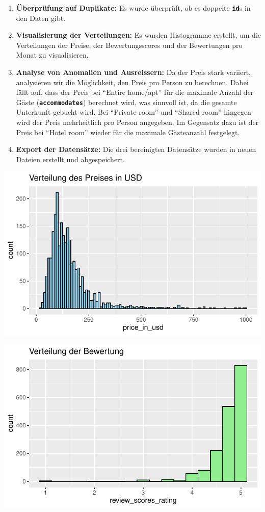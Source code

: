 \documentclass[
  journal,
]{IEEEtran}%
\begin{document}
\begin{enumerate}
\def\labelenumi{\arabic{enumi}.}
\item
  \textbf{Überprüfung auf Duplikate:} Es wurde überprüft, ob es doppelte
  \textbf{\texttt{id}}s in den Daten gibt.
\item
  \textbf{Visualisierung der Verteilungen:} Es wurden Histogramme
  erstellt, um die Verteilungen der Preise, der Bewertungsscores und der
  Bewertungen pro Monat zu visualisieren.
\item
  \textbf{Analyse von Anomalien und Ausreissern:} Da der Preis stark
  variiert, analysieren wir die Möglichkeit, den Preis pro Person zu
  berechnen. Dabei fällt auf, dass der Preis bei ``Entire home/apt'' für
  die maximale Anzahl der Gäste (\textbf{\texttt{accommodates}})
  berechnet wird, was sinnvoll ist, da die gesamte Unterkunft gebucht
  wird. Bei ``Private room'' und ``Shared room'' hingegen wird der Preis
  mehrheitlich pro Person angegeben. Im Gegensatz dazu ist der Preis bei
  ``Hotel room'' wieder für die maximale Gästeanzahl festgelegt.
\item
  \textbf{Export der Datensätze:} Die drei bereinigten Datensätze wurden
  in neuen Dateien erstellt und abgespeichert.
\end{enumerate}

\includegraphics{main_files/figure-pdf/eda-1.pdf}

\includegraphics{main_files/figure-pdf/eda-2.pdf}
\end{document}
